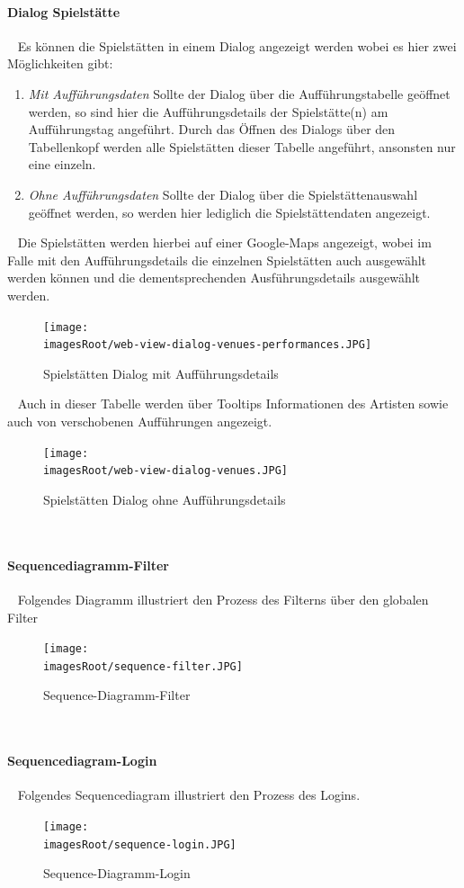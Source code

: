 \documentclass[11pt, a4paper, twoside]{article}   	%
\newcommand{\imagesRoot}{images}
\begin{document}
\paragraph{Dialog Spielstätte}
\ \newline 
Es können die Spielstätten in einem Dialog angezeigt werden wobei es hier zwei Möglichkeiten gibt:
\begin{enumerate}
	\item\emph{Mit Aufführungsdaten}
	\newline
	Sollte der Dialog über die Aufführungstabelle geöffnet werden, so sind hier die Aufführungsdetails der Spielstätte(n) am Aufführungstag angeführt. Durch das Öffnen des Dialogs über den Tabellenkopf werden alle Spielstätten dieser Tabelle angeführt, ansonsten nur eine einzeln. 
	\item\emph{Ohne Aufführungsdaten}
	\newline
	Sollte der Dialog über die Spielstättenauswahl geöffnet werden, so werden hier lediglich die Spielstättendaten angezeigt.
\end{enumerate}
\ \newline
Die Spielstätten werden hierbei auf einer Google-Maps angezeigt, wobei im Falle mit den Aufführungsdetails die einzelnen Spielstätten auch ausgewählt werden können und die dementsprechenden Ausführungsdetails ausgewählt werden.
\begin{figure}[h]
	\centering
	\texttt{[image: \\imagesRoot/web-view-dialog-venues-performances.JPG]}
	\caption
	{Spielstätten Dialog mit Aufführungsdetails}
\end{figure}
\ \newline
Auch in dieser Tabelle werden über Tooltips Informationen des Artisten sowie auch von verschobenen Aufführungen angezeigt.
 \newpage
\begin{figure}[h]
	\centering
	\texttt{[image: \\imagesRoot/web-view-dialog-venues.JPG]}
	\caption
	{Spielstätten Dialog ohne Aufführungsdetails}
\end{figure}
\ \newpage
\paragraph{Sequencediagramm-Filter}
\ \newline
Folgendes Diagramm illustriert den Prozess des Filterns über den globalen Filter
\begin{figure}[h]
	\centering
	\texttt{[image: \\imagesRoot/sequence-filter.JPG]}
	\caption
	{Sequence-Diagramm-Filter}
\end{figure}
\ \newpage

\paragraph{Sequencediagram-Login}
\ \newline
Folgendes Sequencediagram illustriert den Prozess des Logins.
\begin{figure}[h]
	\centering
	\texttt{[image: \\imagesRoot/sequence-login.JPG]}
	\caption
	{Sequence-Diagramm-Login}
\end{figure}
\end{document}
